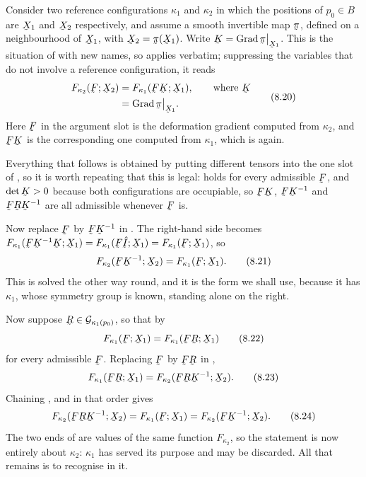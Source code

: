 Consider two reference configurations $\kappa_{1}$ and $\kappa_{2}$ in
which the positions of $p_{0}\in B$ are $\bX_{1}$ and $\bX_{2}$
respectively, and assume a smooth invertible map $\vek{\pi}$, defined on
a neighbourhood of $\bX_{1}$, with $\bX_{2}=\vek{\pi}(\bX_{1})$. Write
$\bK=\Grad\vek{\pi}\rest{\bX_{1}}$. This is the situation of 
with new names, so  applies verbatim; suppressing the
variables that do not involve a reference configuration, it reads
\begin{equation}
\begin{aligned}
   F_{\kappa_{2}}(\bF;\bX_{2})&=F_{\kappa_{1}}(\bF\bK;\bX_{1}),
   \qquad\text{where }\bK\\
   &=\Grad\vek{\pi}\rest{\bX_{1}} .
\end{aligned}
   \tag{8.20}\label{eq:8.20}
\end{equation}
Here $\bF$ in the argument slot is the deformation gradient computed
from $\kappa_{2}$, and $\bF\bK$ is the corresponding one computed from
$\kappa_{1}$, which is  again.

Everything that follows is obtained by putting different tensors into
the one slot of , so it is worth repeating that this is legal:
 holds for every admissible $\bF$, and $\det\bK>0$ because
both configurations are occupiable, so $\bF\bK$, $\bF\bK^{-1}$ and
$\bF\bR\bK^{-1}$ are all admissible whenever $\bF$ is.

Now replace $\bF$ by $\bF\bK^{-1}$ in . The right-hand side
becomes $F_{\kappa_{1}}(\bF\bK^{-1}\bK;\bX_{1})=F_{\kappa_{1}}
(\bF\hI;\bX_{1})=F_{\kappa_{1}}(\bF;\bX_{1})$, so
\begin{equation}
   F_{\kappa_{2}}(\bF\bK^{-1};\bX_{2})=F_{\kappa_{1}}(\bF;\bX_{1}).
   \tag{8.21}\label{eq:8.21}
\end{equation}
This is  solved the other way round, and it is the form we
shall use, because it has $\kappa_{1}$, whose symmetry group is known,
standing alone on the right.

Now suppose $\bR\in\mathcal{G}_{\kappa_{1}(p_{0})}$, so that by
\begin{equation}
   F_{\kappa_{1}}(\bF;\bX_{1})=F_{\kappa_{1}}(\bF\bR;\bX_{1})
   \tag{8.22}\label{eq:8.22}
\end{equation}
for every admissible $\bF$. Replacing $\bF$ by $\bF\bR$ in ,
\begin{equation}
   F_{\kappa_{1}}(\bF\bR;\bX_{1})
   =F_{\kappa_{2}}(\bF\bR\bK^{-1};\bX_{2}).
   \tag{8.23}\label{eq:8.23}
\end{equation}
Chaining ,  and  in that order gives
\begin{equation}
   F_{\kappa_{2}}(\bF\bR\bK^{-1};\bX_{2})
   =F_{\kappa_{1}}(\bF;\bX_{1})
   =F_{\kappa_{2}}(\bF\bK^{-1};\bX_{2}).
   \tag{8.24}\label{eq:8.24}
\end{equation}
The two ends of  are values of the same function
$F_{\kappa_{2}}$, so the statement is now entirely about $\kappa_{2}$:
$\kappa_{1}$ has served its purpose and may be discarded. All that
remains is to recognise  in it.

